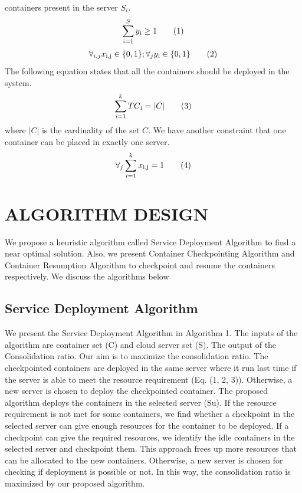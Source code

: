 \documentclass[conference]{IEEEtran}
\newcommand\numberthis{\addtocounter{equation}{1}\tag{\theequation}}
\begin{document}
containers present in the server  \begin{math} S_{i}\end{math}.
\begin{align*} \sum_{i=1}^{S} y\textsubscript{i} \geq 1 \numberthis \label{eqn} \end{align*} 
\begin{align*} \forall_{i,j}  x\textsubscript{i,j} \in \{0 , 1\} ; \forall_{j} y\textsubscript{i} \in \{0 , 1\} \numberthis \label{eqn} \end{align*} 
The following equation states that all the containers should
be deployed in the system. 
\begin{align*} \sum_{i=1}^{k} TC\textsubscript{i} =\mathopen | C \mathclose | \numberthis \label{eqn} \end{align*} 
where \begin{math}\mathopen | C \mathclose | \end{math} is the cardinality of the set \begin{math} C \end{math}.
We have another constraint that one container can be placed
in exactly one server.
\begin{align*}  \forall_{j} \sum_{i=1}^{k} x\textsubscript{i,j} =1 \numberthis \label{eqn} \end{align*} 

\section{ALGORITHM DESIGN}
We propose a heuristic algorithm called Service Deployment
Algorithm to find a near optimal solution. Also, we present
Container Checkpointing Algorithm and Container Resumption Algorithm to checkpoint and resume the containers respectively. We discuss the algorithms below
\subsection{Service Deployment Algorithm}
We present the Service Deployment Algorithm in Algorithm 1. The inputs of the algorithm are container set (C) and
cloud server set (S). The output of the Consolidation ratio.
Our aim is to maximize the consolidation ratio. The checkpointed containers are deployed in the same server where it run
last time if the server is able to meet the resource requirement
(Eq. (1, 2, 3)). Otherwise, a new server is chosen to deploy
the checkpointed container. The proposed algorithm deploys
the containers in the selected server (Su). If the resource
requirement is not met for some containers, we find whether
a checkpoint in the selected server can give enough resources
for the container to be deployed. If a checkpoint can give
the required resources, we identify the idle containers in the selected server and checkpoint them. This approach frees up
more resources that can be allocated to the new containers.
Otherwise, a new server is chosen for checking if deployment
is possible or not. In this way, the consolidation ratio is
maximized by our proposed algorithm. 
\end{document}
